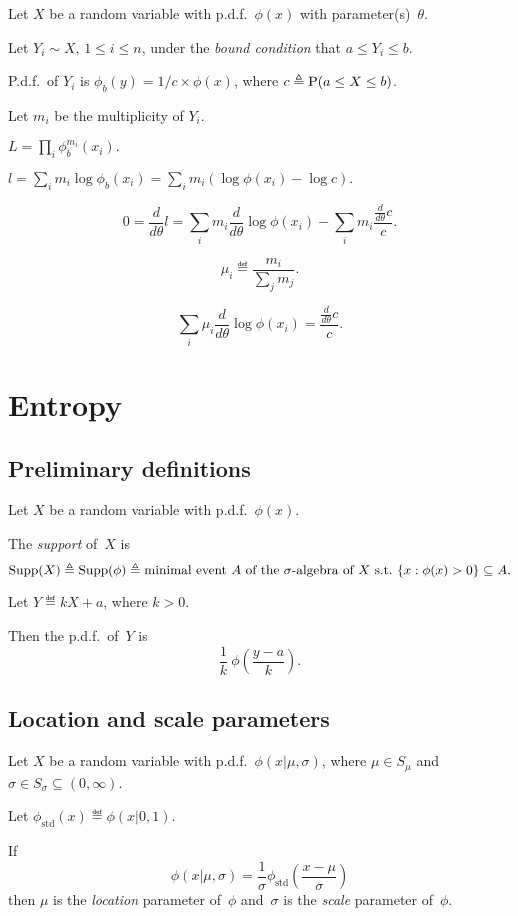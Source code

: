 \documentclass[10pt,a4paper]{article}
\theoremstyle{plain} \newtheorem{Lem}{Lemma}
\begin{document}
Let $X$ be a random variable with p.d.f.~$\phi(x)$ with parameter(s)~$\theta$.

Let $Y_i \sim X$, $1 \le i \le n$, under the {\em bound condition} that $a \le Y_i \le b$.

P.d.f.~of $Y_i$ is $\phi_b(y) = 1/c \times \phi(x)$, where $c \triangleq \mathrm P (a \le X \le b)$.

Let $m_i$ be the multiplicity of $Y_i$.

$L = \prod_i \phi_b^{m_i}(x_i).$

$l = \sum_i m_i \log \phi_b(x_i) = \sum_i m_i (\log \phi(x_i) - \log c).$

$$0 = \frac d {d \theta} l = \sum_i m_i \frac d {d \theta} \log \phi(x_i) - \sum_i m_i \frac {\frac d {d \theta} c} c.$$

$$\mu_i \eqdef \frac {m_i} {\sum_j m_j}.$$

$$\sum_i \mu_i \frac d {d \theta} \log \phi(x_i) = \frac {\frac d {d \theta} c} c.$$



\section{Entropy}

\subsection{Preliminary definitions}
Let $X$ be a random variable with p.d.f.~$\phi(x)$.

The {\em support} of~$X$ is
$$\mathrm {Supp}(X) \triangleq \mathrm {Supp}(\phi) \triangleq \text{minimal event~$A$ of the $\sigma$-algebra of~$X$ s.t.}~\{x:\phi(x) > 0\} \subseteq A. $$

Let $Y \eqdef k X + a$, where $k > 0$.

Then the p.d.f.~of~$Y$ is $$\frac 1 k \ \phi \left(\frac {y - a} k \right). $$


\subsection{Location and scale parameters}
Let $X$ be a random variable with p.d.f.~$\phi(x|\mu,\sigma)$, where $\mu \in S_\mu$ and $\sigma \in S_\sigma \subseteq (0,\infty)$.

Let $\phi_{\mathrm {std}}(x) \eqdef \phi(x|0,1) $.

If
\begin{equation}
\phi(x|\mu,\sigma) = \frac 1 \sigma \phi_{\mathrm {std}}\left(\frac {x - \mu} \sigma \right)  \label{loc_scale}
\end{equation}
then $\mu$ is the {\em location} parameter of~$\phi$ and~$\sigma$ is the {\em scale} parameter of~$\phi$.
\end{document}
